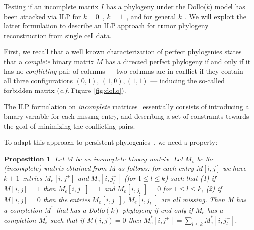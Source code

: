 \documentclass[a4paper,USenglish]{article}
\newtheorem{proposition}[theorem]{Proposition}
\theoremstyle{definition}
\begin{document}
Testing if an incomplete matrix $I$ has a phylogeny under the
Dollo($k$) model has been attacked via ILP for
$k=0$~\cite{Gusfield2007}, $k=1$~\cite{gusfield_persistent_2015}, and
for general $k$~\cite{Bonizzoni:2017:BPP:3107411.3107441}.  We will
exploit the latter formulation to describe an ILP approach for tumor
phylogeny reconstruction from single cell data.


First, we recall that a well known characterization of perfect
phylogenies states that a \emph{complete} binary matrix $M$ has a
directed perfect phylogeny if and only if it has no \emph{conflicting}
pair of columns --- two columns are in conflict if they contain all
three configurations $(0,1)$, $(1,0), (1,1)$ --- inducing the
so-called forbidden matrix (\emph{c.f.} Figure~\ref{fig:dollo}).

The ILP formulation on \emph{incomplete} matrices~\cite{Gusfield2007}
essentially consists of introducing a binary variable for each missing
entry, and describing a set of constraints towards the goal of
minimizing the conflicting pairs.

To adapt this approach to persistent
phylogenies~\cite{gusfield_persistent_2015}, we need a
property: 

\begin{proposition}
  \label{proposition:extended matrix}
  \cite{Bonizzoni:2017:BPP:3107411.3107441} Let $M$ be an incomplete
  binary matrix.  Let $M_{e}$ be the (incomplete) matrix obtained from
  $M$ as follows: for each entry $M[i,j]$ we have $k+1$ entries
  $M_{e}[i,j^{+}]$ and $M_{e}[i,j_{l}^{-}]$ (for $1\le l\le k$) such
  that (1) if $M[i,j] = 1$ then $M_{e}[i,j^{+}] = 1$ and
  $M_{e}[i,j_{l}^{-}] = 0$ for $1\le l\le k$, (2) if $M[i,j] = 0$ then
  the entries $M_{e}[i,j^{+}]$, $ M_{e}[i,j_{l}^{-}]$ are all missing.
  Then $M$ has a completion $M^{*}$ that has a Dollo$(k)$ phylogeny if
  and only if $M_{e}$ has a completion $M^{*}_{e}$ such that if
  $M(i,j)= 0$ then
  $M^{*}_{e}[i,j^{+}] = \sum_{l\le k} M^{*}_{e}[i,j_{l}^{-}]$.
\end{proposition}
\end{document}
